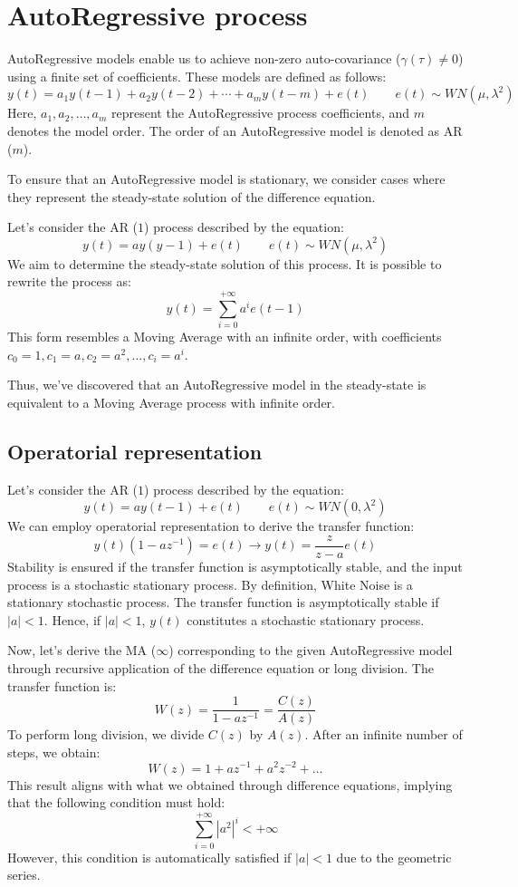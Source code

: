 \section{AutoRegressive process}

AutoRegressive models enable us to achieve non-zero auto-covariance ($\gamma(\tau)\neq 0$) using a finite set of coefficients. 
These models are defined as follows:
\[y(t)=a_1y(t-1)+a_2y(t-2)+\cdots+a_m y(t-m)+e(t) \qquad e(t)\sim WN(\mu,\lambda^2)\]
Here, $a_1,a_2,\dots,a_m$ represent the AutoRegressive process coefficients, and $m$ denotes the model order. 
The order of an AutoRegressive model is denoted as AR ($m$).

To ensure that an AutoRegressive model is stationary, we consider cases where they represent the steady-state solution of the difference equation.
\begin{example}
    Let's consider the AR ($1$) process described by the equation:
    \[y(t)=ay(y-1)+e(t)\qquad e(t) \sim WN(\mu,\lambda^2)\]
    We aim to determine the steady-state solution of this process. 
    It is possible to rewrite the process as:
    \[y(t)=\sum_{i=0}^{+\infty}a^i e(t-1)\]
    This form resembles a Moving Average with an infinite order, with coefficients  $c_0=1,c_1=a,c_2=a^2,\dots,c_i=a^i$. 
\end{example}
Thus, we've discovered that an AutoRegressive model in the steady-state is equivalent to a Moving Average process with infinite order.

\subsection{Operatorial representation}
Let's consider the AR ($1$) process described by the equation:
\[y(t)=ay(t-1)+e(t) \qquad e(t)\sim WN(0,\lambda^2)\]
We can employ operatorial representation to derive the transfer function:
\[y(t)\left( 1 -az^{-1} \right)=e(t) \rightarrow y(t)=\dfrac{z}{z-a}e(t)\]
Stability is ensured if the transfer function is asymptotically stable, and the input process is a stochastic stationary process.
By definition, White Noise is a stationary stochastic process. 
The transfer function is asymptotically stable if $\left\lvert a \right\rvert<1$.
Hence, if $\left\lvert a \right\rvert<1$, $y(t)$ constitutes a stochastic stationary process.

Now, let's derive the MA ($\infty$) corresponding to the given AutoRegressive model through recursive application of the difference equation or long division. 
The transfer function is:
\[W(z)=\dfrac{1}{1-az^{-1}}=\dfrac{C(z)}{A(z)}\]
To perform long division, we divide $C(z)$ by $A(z)$. 
After an infinite number of steps, we obtain:
\[W(z)=1+az^{-1}+a^2z^{-2}+\dots\]
This result aligns with what we obtained through difference equations, implying that the following condition must hold:
\[\sum_{i=0}^{+\infty} \left\lvert a^2 \right\rvert^i<+\infty \]
However, this condition is automatically satisfied if $\left\lvert a \right\rvert<1$ due to the geometric series.

